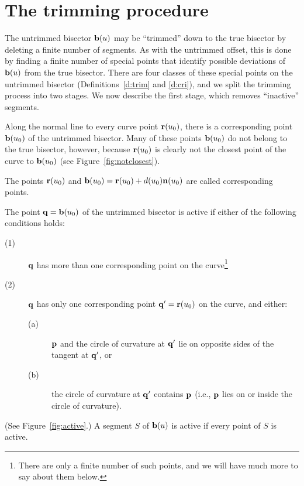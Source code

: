\section{The trimming procedure}
\label{trimming}

The untrimmed bisector ${\bf b}(u)$ may be ``trimmed'' down to the true
bisector by deleting a finite number of segments. As with the untrimmed
offset, this is done by finding a finite number of special points that
identify possible deviations of ${\bf b}(u)$ from the true bisector.
There are four classes of these special points on the untrimmed bisector
(Definitions~\ref{d:trim} and \ref{d:cri}), and we split the trimming
process into two stages. We now describe the first stage, which removes
``inactive'' segments.

Along the normal line to every curve point ${\bf r}(u_0)$, there is a
corresponding point ${\bf b}(u_0)$ of the untrimmed bisector. Many of
these points ${\bf b}(u_0)$ do not belong to the true bisector, however,
because ${\bf r}(u_0)$ is clearly not the closest point of the curve to
${\bf b}(u_0)$ (see Figure~\ref{fig:notclosest}).


\begin{dfn}
The points ${\bf r}(u_0)$ and ${\bf b}(u_0) = {\bf r}(u_0) +
d(u_0){\bf n}(u_0)$ are called
{\rm corresponding} points.
\end{dfn}

\begin{dfn}
The point ${\bf q} = {\bf b}(u_{0})$ of the untrimmed bisector is
{\rm active} if either of the following conditions holds:
\begin{description}
\item[(1)]
        ${\bf q}$ has more than one corresponding point on the
        curve\footnote{There are only a finite number of such points,
        and we will have much more to say about them below.}
\item[(2)]
        ${\bf q}$ has only one corresponding point ${\bf q}' =
        {\bf r}(u_0)$ on the curve, and either:
\begin{description}
\item[(a)]
        ${\bf p}$ and the circle of curvature at ${\bf q}'$
        lie on opposite sides of the tangent at ${\bf q'}$, or
\item[(b)]
        the circle of curvature at ${\bf q}'$ contains ${\bf p}$
        (i.e., ${\bf p}$ lies on or inside the circle of curvature).
\end{description}
\end{description}
(See Figure~\ref{fig:active}.)
A segment $S$ of ${\bf b}(u)$ is active if every point of $S$ is active.
\end{dfn}

